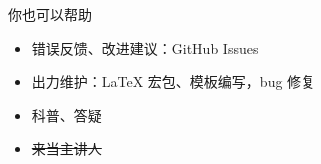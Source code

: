 \begin{frame}{你也可以帮助}
  \begin{itemize}
    \item 错误反馈、改进建议：GitHub Issues 
    \item 出力维护：\LaTeX{} 宏包、模板编写，bug 修复
    \item 科普、答疑 
    \item \sout{来当主讲人}
  \end{itemize}
\end{frame}

